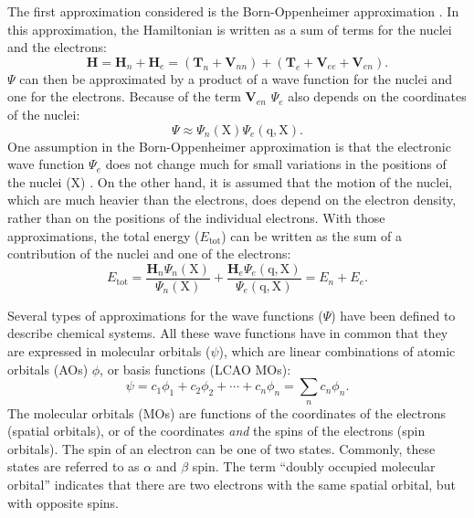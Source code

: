 The first approximation considered is the Born-Oppenheimer approximation \cite{born}. In this approximation, the Hamiltonian is written as a sum of terms for the nuclei and the electrons:
\begin{equation}
\mathbf{H} = \mathbf{H}_n + \mathbf{H}_e = (\mathbf{T}_n + \mathbf{V}_{nn}) + (\mathbf{T}_e + \mathbf{V}_{ee} + \mathbf{V}_{en}).
\label{ch1.eq.hsplit}
\end{equation}
$\Psi$ can then be approximated by a product of a wave function for the nuclei and one for the electrons. Because of the term $\mathbf{V}_{en}$ $\Psi_{e}$ also depends on the coordinates of the nuclei:
\begin{equation}
\Psi \approx \Psi_{n}(\mathrm{X}) \Psi_{e}(\mathrm{q,X}).
\end{equation}
One assumption in the Born-Oppenheimer approximation is that the electronic wave function $\Psi_{e}$ does not change much for small variations in the positions of the nuclei ($\mathrm{X}$) \cite{born}. On the other hand, it is assumed that the motion of the nuclei, which are much heavier than the electrons, does depend on the electron density, rather than on the positions of the individual electrons. With those approximations, the total energy ($E_\mathrm{tot}$) can be written as the sum of a contribution of the nuclei and one of the electrons:
\begin{equation}
E_\mathrm{tot} = \frac{\mathbf{H}_n \Psi_n(\mathrm{X})}{\Psi_n(\mathrm{X})} + \frac{\mathbf{H}_e \Psi_e(\mathrm{q,X})}{\Psi_e(\mathrm{q,X})} = E_{n} + E_{e}.
\end{equation}

Several types of approximations for the wave functions ($\Psi$) have been defined to describe chemical systems. All these wave functions have in common that they are expressed in molecular orbitals ($\psi$), which are linear combinations of atomic orbitals (AOs) $\phi$, or basis functions (LCAO MOs):
\begin{equation}
\psi = c_1 \phi_1 + c_2 \phi_2 + \cdots + c_n \phi_n = \sum_n c_n \phi_n.
\label{ch1.eq.lcaomo}
\end{equation}
The molecular orbitals (MOs) are functions of the coordinates of the electrons (spatial orbitals), or of the coordinates \textit{and} the spins of the electrons (spin orbitals). The spin of an electron can be one of two states. Commonly, these states are referred to as $\alpha$ and $\beta$ spin. The term ``doubly occupied molecular orbital'' indicates that there are two electrons with the same spatial orbital, but with opposite spins.


